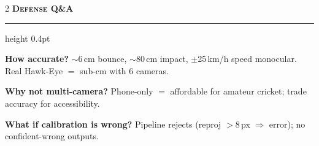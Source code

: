 \documentclass[9pt,a4paper]{extarticle}
\newenvironment{tightitemize}{%
  \begin{list}{\textbullet}{%
    \setlength{\leftmargin}{10pt}%
    \setlength{\labelwidth}{6pt}%
    \setlength{\labelsep}{3pt}%
    \setlength{\itemsep}{0pt}%
    \setlength{\parsep}{0pt}%
    \setlength{\topsep}{1pt}%
    \setlength{\partopsep}{0pt}%
  }%
}{\end{list}}
\renewcommand{\section}[1]{%
  \vspace{3pt}%
  {\color{amber}\bfseries\scshape\normalsize #1}\par
  \vspace{1pt}%
  \hrule height 0.4pt\relax
  \vspace{2pt}%
}
\begin{document}
\begin{multicols}{2}
\section{Defense Q\&A}
\begin{tightitemize}
\item \textbf{How accurate?} $\sim$6\,cm bounce, $\sim$80\,cm impact, $\pm$25\,km/h speed monocular. Real Hawk-Eye $=$ sub-cm with 6 cameras.
\item \textbf{Why not multi-camera?} Phone-only $=$ affordable for amateur cricket; trade accuracy for accessibility.
\item \textbf{What if calibration is wrong?} Pipeline rejects (reproj $> 8$\,px $\Rightarrow$ error); no confident-wrong outputs.
\end{tightitemize}

\end{multicols}
\end{document}
